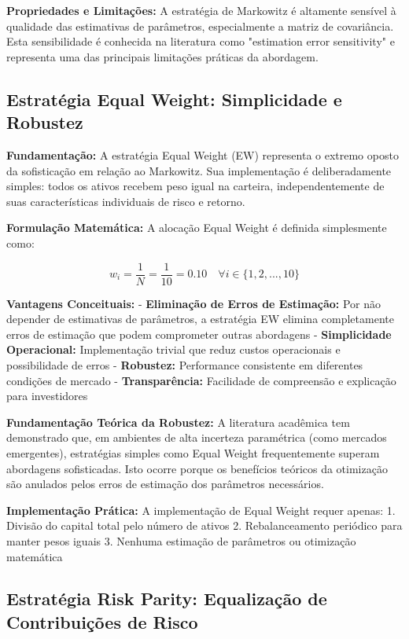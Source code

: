 \textbf{Propriedades e Limitações:} A estratégia de Markowitz é altamente sensível à qualidade das estimativas de parâmetros, especialmente a matriz de covariância. Esta sensibilidade é conhecida na literatura como "estimation error sensitivity" e representa uma das principais limitações práticas da abordagem.

\subsection{Estratégia Equal Weight: Simplicidade e Robustez}

\textbf{Fundamentação:} A estratégia Equal Weight (EW) representa o extremo oposto da sofisticação em relação ao Markowitz. Sua implementação é deliberadamente simples: todos os ativos recebem peso igual na carteira, independentemente de suas características individuais de risco e retorno.

\textbf{Formulação Matemática:} A alocação Equal Weight é definida simplesmente como:

\begin{equation}
w_i = \frac{1}{N} = \frac{1}{10} = 0.10 \quad \forall i \in \{1, 2, ..., 10\}
\end{equation}

\textbf{Vantagens Conceituais:}
- \textbf{Eliminação de Erros de Estimação:} Por não depender de estimativas de parâmetros, a estratégia EW elimina completamente erros de estimação que podem comprometer outras abordagens
- \textbf{Simplicidade Operacional:} Implementação trivial que reduz custos operacionais e possibilidade de erros
- \textbf{Robustez:} Performance consistente em diferentes condições de mercado
- \textbf{Transparência:} Facilidade de compreensão e explicação para investidores

\textbf{Fundamentação Teórica da Robustez:} A literatura acadêmica tem demonstrado que, em ambientes de alta incerteza paramétrica (como mercados emergentes), estratégias simples como Equal Weight frequentemente superam abordagens sofisticadas. Isto ocorre porque os benefícios teóricos da otimização são anulados pelos erros de estimação dos parâmetros necessários.

\textbf{Implementação Prática:} A implementação de Equal Weight requer apenas:
1. Divisão do capital total pelo número de ativos
2. Rebalanceamento periódico para manter pesos iguais
3. Nenhuma estimação de parâmetros ou otimização matemática

\subsection{Estratégia Risk Parity: Equalização de Contribuições de Risco}

